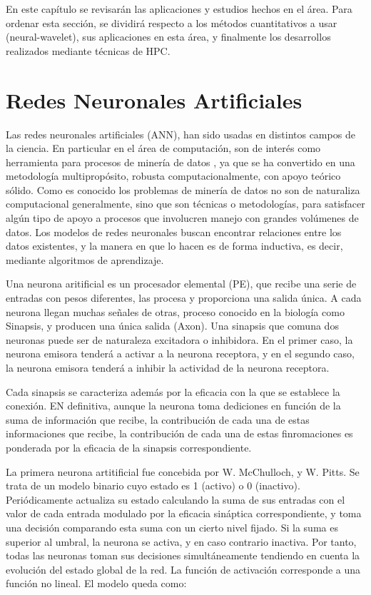 En este capítulo se revisarán las aplicaciones y estudios hechos en el área.
Para ordenar esta sección, se dividirá respecto a los métodos cuantitativos a
usar (neural-wavelet), sus aplicaciones en esta área, y finalmente los
desarrollos realizados mediante técnicas de HPC.

\section{Redes Neuronales Artificiales}

Las redes neuronales artificiales (ANN), han sido usadas en distintos campos de
la ciencia. En particular en el área de computación, son de interés como
herramienta para procesos de minería de datos \cite{bigus1996data}, ya que se
ha convertido en una metodología multipropósito, robusta computacionalmente,
con apoyo teórico sólido. Como es conocido los problemas de minería de datos no
son de naturaliza computacional generalmente, sino que son técnicas o
metodologías, para satisfacer algún tipo de apoyo a procesos que involucren
manejo con grandes volúmenes de datos. Los modelos de redes neuronales buscan
encontrar relaciones entre los datos existentes, y la manera en que lo hacen es
de forma inductiva, es decir, mediante algoritmos de aprendizaje.

Una neurona aritificial es un procesador elemental (PE), que recibe una serie
de entradas con pesos diferentes, las procesa y proporciona una salida única. A
cada neurona llegan muchas señales de otras, proceso conocido en la biología
como Sinapsis, y producen una única salida (Axon). Una sinapsis que comuna dos
neuronas puede ser de naturaleza excitadora o inhibidora. En el primer caso, la
neurona emisora tenderá a activar a la neurona receptora, y en el segundo caso,
la neurona emisora tenderá a inhibir la actividad de la neurona receptora.

Cada sinapsis se caracteriza además por la eficacia con la que se establece la
conexión. EN definitiva, aunque la neurona toma dediciones en función de la
suma de información que recibe, la contribución de cada una de estas
informaciones que recibe, la contribución de cada una de estas finromaciones es
ponderada por la eficacia de la sinapsis correspondiente.

La primera neurona artitificial fue concebida por W. McChulloch, y W. Pitts. Se
trata de un modelo binario cuyo estado es 1 (activo) o 0 (inactivo).
Periódicamente actualiza su estado calculando la suma de sus entradas con el
valor de cada entrada modulado por la eficacia sináptica correspondiente, y
toma una decisión comparando esta suma con un cierto nivel fijado. Si la suma
es superior al umbral, la neurona se activa, y en caso contrario inactiva. Por
tanto, todas las neuronas toman sus decisiones simultáneamente tendiendo en
cuenta la evolución del estado global de la red. La función de activación
corresponde a una función no lineal. El modelo queda como:


